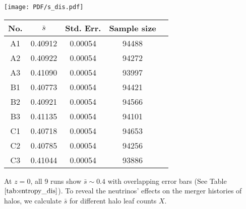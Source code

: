 \begin{minipage}{\columnwidth}
\centering
  \begin{minipage}[b]{0.49\columnwidth}
    \centering
    \texttt{[image: PDF/s\_dis.pdf]}
  \end{minipage}
  \hfill
  \begin{minipage}[b]{0.49\columnwidth}
    \centering
		\begin{tabular}{|c|c|c|c|c|}
			\hline 
			No. & $\bar s$ & Std. Err. & Sample size \\
			\hline \hline
			A1 & 0.40912 & 0.00054 & 94488  \\
			A2 & 0.40922 & 0.00054 & 94272  \\
			A3 & 0.41090 & 0.00054 & 93997  \\
			\hline
			B1 & 0.40773 & 0.00054 & 94421  \\
			B2 & 0.40921 & 0.00054 & 94566  \\
			B3 & 0.41135 & 0.00054 & 94101  \\
			\hline
			C1 & 0.40718 & 0.00054 & 94653  \\
			C2 & 0.40785 & 0.00054 & 94256 \\
			C3 & 0.41044 & 0.00054 & 93886  \\		
			\hline
		\end{tabular}
    \end{minipage}
\end{minipage}
\vspace{0.5cm}
		

At $z=0$, all 9 runs show $\bar s\sim 0.4$ with overlapping error bars (See Table $\ref{tab:entropy_dis}$).
To reveal the neutrinos' effects on the merger histories of halos, we calculate $\bar s$ for different halo leaf counts $X$.


